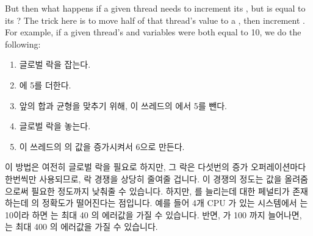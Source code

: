 But then what happens if a given thread needs to increment its
, but  is equal to its ?
The trick here is to move half of that thread's  value
to a , then increment .
For example, if a given thread's  and 
variables were both equal to 10, we do the following:
\fi

\begin{enumerate}
\item	글로벌 락을 잡는다.
\item	{} 에 5를 더한다.
\item	앞의 합과 균형을 맞추기 위해, 이 쓰레드의  에서 5를 뺀다.
\item	글로벌 락을 놓는다.
\item	이 쓰레드의  의 값을 증가시켜서 6으로 만든다.

\end{enumerate}

이 방법은 여전히 글로벌 락을 필요로 하지만, 그 락은 다섯번의 증가
오퍼레이션마다 한번씩만 사용되므로, 락 경쟁을 상당히 줄여줄 겁니다.
이 경쟁의 정도는  값을 올려줌으로써 필요한 정도까지 낮춰줄 수
있습니다.
하지만,  를 늘리는데 대한 페널티가 존재하는데 
의 정확도가 떨어진다는 점입니다.
예를 들어 4개 CPU 가 있는 시스템에서  는 10이라 하면
 는 최대 40 의 에러값을 가질 수 있습니다.
반면,  가 100 까지 늘어나면,  는 최대 400 의
에러값을 가질 수 있습니다.

